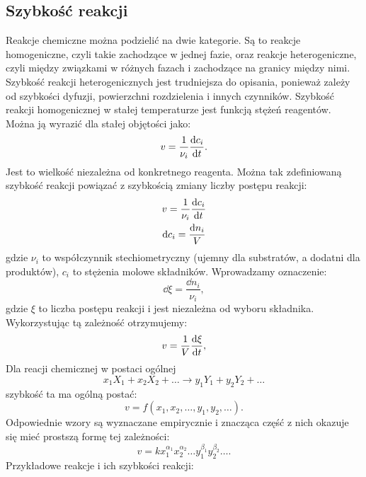 \documentclass[10pt, a4paper, twoside, onecolumn]{article}
\numberwithin{equation}{section}
\begin{document}
	\subsection{Szybkość reakcji}
	Reakcje chemiczne można podzielić na dwie kategorie. Są to reakcje homogeniczne, czyli takie zachodzące w jednej fazie, oraz reakcje heterogeniczne, czyli między związkami w różnych fazach i zachodzące na granicy między nimi. Szybkość reakcji heterogenicznych jest trudniejsza do opisania, ponieważ zależy od szybkości dyfuzji, powierzchni rozdzielenia i innych czynników. %
	Szybkość reakcji homogenicznej w stałej temperaturze jest funkcją stężeń reagentów. Można ją wyrazić dla stałej objętości jako: 
	\begin{equation}
		v=\frac{1}{\nu_i}\dv{c_i}{t}.
	\end{equation}
	Jest to wielkość niezależna od konkretnego reagenta. Można tak zdefiniowaną szybkość reakcji powiązać z szybkością zmiany liczby postępu reakcji:
	\begin{gather}
		v=\frac{1}{\nu_{i}}\dv{c_{i}}{t} \\
		\dd{c_{i}}=\frac{\dd{n_{i}}}{V}
	\end{gather}
	gdzie \(\nu_{i}\) to współczynnik stechiometryczny (ujemny dla substratów, a dodatni dla produktów), \(c_{i}\) to stężenia molowe składników. Wprowadzamy oznaczenie:
	\begin{equation}
		\dd{\xi}=\frac{\dd{n_{i}}}{\nu_{i}},
	\end{equation}
	gdzie \(\xi\) to liczba postępu reakcji i jest niezależna od wyboru składnika. Wykorzystując tą zależność otrzymujemy: 
	\begin{equation}
		v=\frac{1}{V}\dv{\xi}{t},
	\end{equation}
	Dla reacji chemicznej w postaci ogólnej
	\begin{equation*}
		x_{1}X_{1}+x_{2}X_{2}+\ldots \rightarrow y_{1}Y_{1}+y_{2}Y_{2}+\ldots
	\end{equation*}
	szybkość ta ma ogólną postać:
	\begin{equation*}
		v=f\left(x_{1}, x_{2}, \ldots, y_{1}, y_{2}, \ldots\right).
	\end{equation*}
	Odpowiednie wzory są wyznaczane empirycznie i znacząca część z nich okazuje się mieć prostszą formę tej zależności:
	\begin{equation}\label{szybkosc reakcji}
		v=k x_{1}^{\alpha_1}x_{2}^{\alpha_2}\ldots y_{1}^{\beta_1}y_{2}^{\beta_2}\ldots.
	\end{equation}
	Przykładowe reakcje i ich szybkości reakcji:
\end{document}
